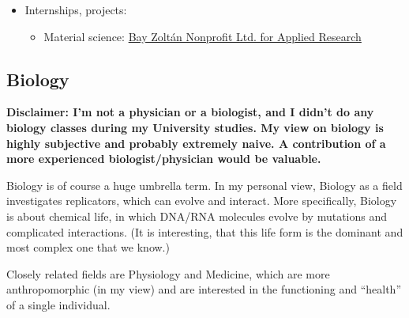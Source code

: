 \documentclass{article}
\begin{document}
\begin{itemize}
    \item Internships, projects:
    \begin{itemize}
        \item Material science: \href{https://www.bayzoltan.hu/en/home/}{Bay Zoltán Nonprofit Ltd. for Applied Research}
    \end{itemize}
    
\end{itemize}


\subsection{Biology}

\textbf{Disclaimer: I'm not a physician or a biologist, and I didn't do any biology classes during my University studies. My view on biology is highly subjective and probably extremely naive. A contribution of a more experienced biologist/physician would be valuable.}

Biology is of course a huge umbrella term. In my personal view, Biology as a field investigates replicators, which can evolve and interact. More specifically, Biology is about chemical life, in which DNA/RNA molecules evolve by mutations and complicated interactions. (It is interesting, that this life form is the dominant and most complex one that we know.)

Closely related fields are Physiology and Medicine, which are more anthropomorphic (in my view) and are interested in the functioning and ``health'' of a single individual.
\end{document}
